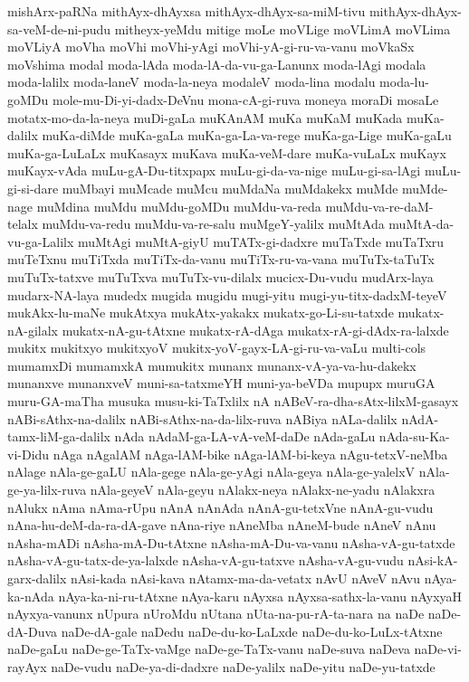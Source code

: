 {mishArx-paRNa
mithAyx-dhAyxsa
mithAyx-dhAyx-sa-miM-tivu
mithAyx-dhAyx-sa-veM-de-ni-pudu
mitheyx-yeMdu
mitige
moLe
moVLige
moVLimA
moVLima
moVLiyA
moVha
moVhi
moVhi-yAgi
moVhi-yA-gi-ru-va-vanu
moVkaSx
moVshima
modal
moda-lAda
moda-lA-da-vu-ga-Lanunx
moda-lAgi
modala
moda-lalilx
moda-laneV
moda-la-neya
modaleV
moda-lina
modalu
moda-lu-goMDu
mole-mu-Di-yi-dadx-DeVnu
mona-cA-gi-ruva
moneya
moraDi
mosaLe
motatx-mo-da-la-neya
muDi-gaLa
muKAnAM
muKa
muKaM
muKada
muKa-dalilx
muKa-diMde
muKa-gaLa
muKa-ga-La-va-rege
muKa-ga-Lige
muKa-gaLu
muKa-ga-LuLaLx
muKasayx
muKava
muKa-veM-dare
muKa-vuLaLx
muKayx
muKayx-vAda
muLu-gA-Du-titxpapx
muLu-gi-da-va-nige
muLu-gi-sa-lAgi
muLu-gi-si-dare
muMbayi
muMcade
muMcu
muMdaNa
muMdakekx
muMde
muMde-nage
muMdina
muMdu
muMdu-goMDu
muMdu-va-reda
muMdu-va-re-daM-telalx
muMdu-va-redu
muMdu-va-re-salu
muMgeY-yalilx
muMtAda
muMtA-da-vu-ga-Lalilx
muMtAgi
muMtA-giyU
muTATx-gi-dadxre
muTaTxde
muTaTxru
muTeTxnu
muTiTxda
muTiTx-da-vanu
muTiTx-ru-va-vana
muTuTx-taTuTx
muTuTx-tatxve
muTuTxva
muTuTx-vu-dilalx
mucicx-Du-vudu
mudArx-laya
mudarx-NA-laya
mudedx
mugida
mugidu
mugi-yitu
mugi-yu-titx-dadxM-teyeV
mukAkx-lu-maNe
mukAtxya
mukAtx-yakakx
mukatx-go-Li-su-tatxde
mukatx-nA-gilalx
mukatx-nA-gu-tAtxne
mukatx-rA-dAga
mukatx-rA-gi-dAdx-ra-lalxde
mukitx
mukitxyo
mukitxyoV
mukitx-yoV-gayx-LA-gi-ru-va-vaLu
multi-cols
mumamxDi
mumamxkA
mumukitx
munanx
munanx-vA-ya-va-hu-dakekx
munanxve
munanxveV
muni-sa-tatxmeYH
muni-ya-beVDa
mupupx
muruGA
muru-GA-maTha
musuka
musu-ki-TaTxlilx
nA
nABeV-ra-dha-sAtx-lilxM-gasayx
nABi-sAthx-na-dalilx
nABi-sAthx-na-da-lilx-ruva
nABiya
nALa-dalilx
nAdA-tamx-liM-ga-dalilx
nAda
nAdaM-ga-LA-vA-veM-daDe
nAda-gaLu
nAda-su-Ka-vi-Didu
nAga
nAgalAM
nAga-lAM-bike
nAga-lAM-bi-keya
nAgu-tetxV-neMba
nAlage
nAla-ge-gaLU
nAla-gege
nAla-ge-yAgi
nAla-geya
nAla-ge-yalelxV
nAla-ge-ya-lilx-ruva
nAla-geyeV
nAla-geyu
nAlakx-neya
nAlakx-ne-yadu
nAlakxra
nAlukx
nAma
nAma-rUpu
nAnA
nAnAda
nAnA-gu-tetxVne
nAnA-gu-vudu
nAna-hu-deM-da-ra-dA-gave
nAna-riye
nAneMba
nAneM-bude
nAneV
nAnu
nAsha-mADi
nAsha-mA-Du-tAtxne
nAsha-mA-Du-va-vanu
nAsha-vA-gu-tatxde
nAsha-vA-gu-tatx-de-ya-lalxde
nAsha-vA-gu-tatxve
nAsha-vA-gu-vudu
nAsi-kA-garx-dalilx
nAsi-kada
nAsi-kava
nAtamx-ma-da-vetatx
nAvU
nAveV
nAvu
nAya-ka-nAda
nAya-ka-ni-ru-tAtxne
nAya-karu
nAyxsa
nAyxsa-sathx-la-vanu
nAyxyaH
nAyxya-vanunx
nUpura
nUroMdu
nUtana
nUta-na-pu-rA-ta-nara
na
naDe
naDe-dA-Duva
naDe-dA-gale
naDedu
naDe-du-ko-LaLxde
naDe-du-ko-LuLx-tAtxne
naDe-gaLu
naDe-ge-TaTx-vaMge
naDe-ge-TaTx-vanu
naDe-suva
naDeva
naDe-vi-rayAyx
naDe-vudu
naDe-ya-di-dadxre
naDe-yalilx
naDe-yitu
naDe-yu-tatxde
}
